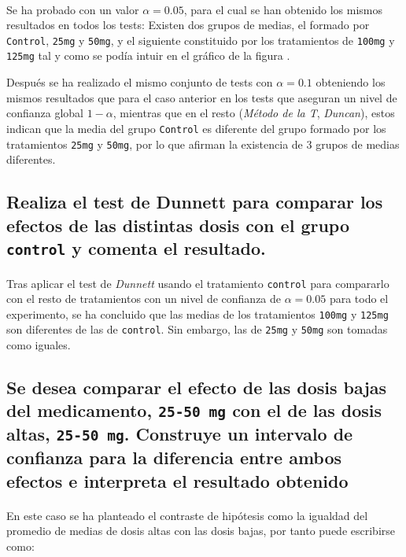 \documentclass{article}
\begin{document}
      \paragraph{}
      Se ha probado con un valor $\alpha = 0.05$, para el cual se han obtenido los mismos resultados en todos los tests: Existen dos grupos de medias, el formado por \texttt{Control}, \texttt{25mg} y \texttt{50mg}, y el siguiente constituido por los tratamientos de \texttt{100mg} y \texttt{125mg} tal y como se podía intuir en el gráfico de la figura \label{fig:figura_1}.

      Después se ha realizado el mismo conjunto de tests con $\alpha = 0.1$ obteniendo los mismos resultados que para el caso anterior en los tests que aseguran un nivel de confianza global $1-\alpha$, mientras que en el resto (\emph{Método de la T}, \emph{Duncan}), estos indican que la media del grupo \texttt{Control} es diferente del grupo formado por los tratamientos \texttt{25mg} y \texttt{50mg}, por lo que afirman la existencia de 3 grupos de medias diferentes.

    \subsection{Realiza el test de Dunnett para comparar los efectos de las distintas dosis con el grupo \texttt{control} y comenta el resultado.}

      \paragraph{}
      Tras aplicar el test de \emph{Dunnett} usando el tratamiento \texttt{control} para compararlo con el resto de tratamientos con un nivel de confianza de $\alpha=0.05$ para todo el experimento, se ha concluido que las medias de los tratamientos \texttt{100mg} y \texttt{125mg} son diferentes de las de \texttt{control}. Sin embargo, las de \texttt{25mg} y \texttt{50mg} son tomadas como iguales.


    \subsection{Se desea comparar el efecto de las dosis bajas del medicamento, \texttt{25-50 mg} con el de las dosis altas, \texttt{25-50 mg}. Construye un intervalo de confianza para la diferencia entre ambos efectos e interpreta el resultado obtenido}

      \paragraph{}
      En este caso se ha planteado el contraste de hipótesis como la igualdad del promedio de medias de dosis altas con las dosis bajas, por tanto puede escribirse como:
\end{document}
